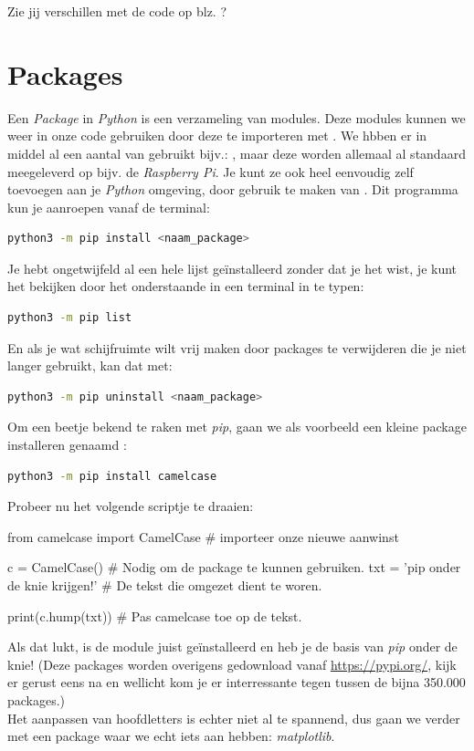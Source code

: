 \begin{exercise}
Zie jij verschillen met de code op blz. \pageref{sec:piledobj}?
\end{exercise}

\newpage

\section{Packages}
Een \textit{Package} in \textit{Python} is een verzameling van modules. Deze modules kunnen we weer in onze code gebruiken door deze te importeren met . We hbben er in middel al een aantal van gebruikt bijv.: , maar deze worden allemaal al standaard meegeleverd op bijv. de \textit{Raspberry Pi}. Je kunt ze ook heel eenvoudig zelf toevoegen aan je \textit{Python} omgeving, door gebruik te maken van . Dit programma kun je aanroepen vanaf de terminal:

\begin{lstlisting}[language=bash]
python3 -m pip install <naam_package>
\end{lstlisting}

\begin{remark}
Je hebt ongetwijfeld al een hele lijst geïnstalleerd zonder dat je het wist, je kunt het bekijken door het onderstaande in een terminal in te typen: 
\begin{lstlisting}[language=bash]
python3 -m pip list
\end{lstlisting}
En als je wat schijfruimte wilt vrij maken door packages te verwijderen die je niet langer gebruikt, kan dat met:
\begin{lstlisting}[language=bash]
python3 -m pip uninstall <naam_package>
\end{lstlisting}
\end{remark}

Om een beetje bekend te raken met \textit{pip}, gaan we als voorbeeld een kleine package installeren genaamd :
\begin{lstlisting}[language=bash]
python3 -m pip install camelcase
\end{lstlisting}

Probeer nu het volgende scriptje te draaien:
\begin{python}
from camelcase import CamelCase     # importeer onze nieuwe aanwinst

c = CamelCase()                     # Nodig om de package te kunnen gebruiken.
txt = 'pip onder de knie krijgen!'  # De tekst die omgezet dient te woren.

print(c.hump(txt))                  # Pas camelcase toe op de tekst.
\end{python}
Als dat lukt, is de module juist geïnstalleerd en heb je de basis van \textit{pip} onder de knie! (Deze packages worden overigens gedownload vanaf \url{https://pypi.org/}, kijk er gerust eens na en wellicht kom je er interressante tegen tussen de bijna 350.000 packages.) \\
Het aanpassen van hoofdletters is echter niet al te spannend, dus gaan we verder met een package waar we echt iets aan hebben: \textit{matplotlib}. 

